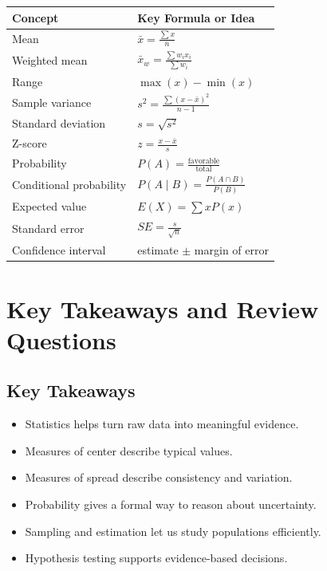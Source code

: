 \documentclass[11pt,a4paper]{article}
\begin{document}
\begin{longtable}{L{3.6cm}L{7.6cm}}
\toprule
\textbf{Concept} & \textbf{Key Formula or Idea} \\
\midrule
Mean & $\bar{x} = \frac{\sum x}{n}$ \\
Weighted mean & $\bar{x}_w = \frac{\sum w_ix_i}{\sum w_i}$ \\
Range & $\max(x) - \min(x)$ \\
Sample variance & $s^2 = \frac{\sum (x-\bar{x})^2}{n-1}$ \\
Standard deviation & $s = \sqrt{s^2}$ \\
Z-score & $z = \frac{x-\bar{x}}{s}$ \\
Probability & $P(A) = \frac{\text{favorable}}{\text{total}}$ \\
Conditional probability & $P(A \mid B) = \frac{P(A \cap B)}{P(B)}$ \\
Expected value & $E(X) = \sum xP(x)$ \\
Standard error & $SE = \frac{s}{\sqrt{n}}$ \\
Confidence interval & estimate $\pm$ margin of error \\
\bottomrule
\end{longtable}

\section{Key Takeaways and Review Questions}

\subsection{Key Takeaways}

\begin{itemize}[leftmargin=*]
  \item Statistics helps turn raw data into meaningful evidence.
  \item Measures of center describe typical values.
  \item Measures of spread describe consistency and variation.
  \item Probability gives a formal way to reason about uncertainty.
  \item Sampling and estimation let us study populations efficiently.
  \item Hypothesis testing supports evidence-based decisions.
\end{itemize}
\end{document}
